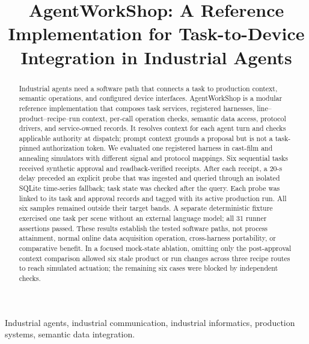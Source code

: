 \documentclass[journal]{IEEEtran}
\begin{document}

\title{AgentWorkShop: A Reference Implementation for Task-to-Device Integration in Industrial Agents}

\author{}

\maketitle

\begin{abstract}
Industrial agents need a software path that connects a task to production
context, semantic operations, and configured device interfaces. AgentWorkShop
is a modular reference implementation that composes task services, registered
harnesses, line--product--recipe--run context, per-call operation checks,
semantic data access, protocol drivers, and service-owned records. It resolves
context for each agent turn and checks applicable authority at dispatch; prompt
context grounds a proposal but is not a task-pinned authorization token. We
evaluated one registered harness in cast-film and annealing simulators with
different signal and protocol mappings. Six sequential tasks received
synthetic approval and readback-verified receipts. After each receipt, a 20-s
delay preceded an explicit probe that was ingested and queried through an
isolated SQLite time-series fallback; task state was checked after the query.
Each probe was linked to its task and approval records and tagged with its
active production run. All six samples remained outside their target bands. A
separate deterministic fixture exercised one task per scene without an
external language model; all 31 runner assertions passed. These results
establish the tested software paths, not process attainment, normal online
data acquisition operation, cross-harness portability, or comparative
benefit. In a focused mock-state ablation, omitting only the post-approval
context comparison allowed six stale product or run changes across three
recipe routes to reach simulated actuation; the remaining six cases were
blocked by independent checks.
\end{abstract}

\begin{IEEEkeywords}
Industrial agents, industrial communication, industrial informatics,
production systems, semantic data integration.
\end{IEEEkeywords}
\end{document}
